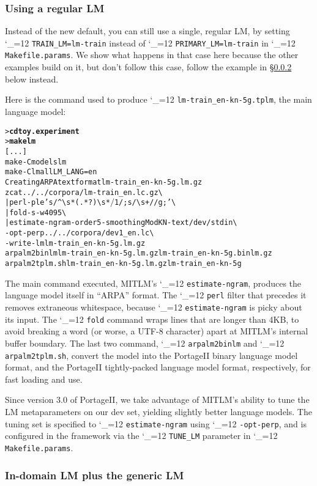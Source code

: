 \documentclass[11pt,letterpaper]{article}
\newcommand{\bs}{\textbackslash{}}
\newcommand{\PS}{PortageII\xspace}
\def\code{\begingroup\catcode`\_=12 \codex}
\newcommand{\codex}[1]{\texttt{#1}\endgroup}
\begin{document}
\subsubsection{Using a regular LM}

Instead of the new default, you can still use a single, regular LM, by setting
\code{TRAIN_LM=lm-train} instead of \code{PRIMARY_LM=lm-train} in
\code{Makefile.params}. We show what happens in that case here because the
other examples build on it, but don't follow this case, follow the example in
\S\ref{LM+generic-default} below instead.

Here is the command used to produce
\code{lm-train_en-kn-5g.tplm},
the main language model:
\begin{small}
\begin{alltt}
   > \textbf{cd toy.experiment}
   > \textbf{make lm}
   [...]
   make -C models lm
   make -C lm all LM_LANG=en
   Creating ARPA text format lm-train_en-kn-5g.lm.gz
   zcat ../../corpora/lm-train_en.lc.gz \bs
      | perl -ple 's/^{\bs}s*(.*?){\bs}s*$/$1/; s/{\bs}s+/ /g;' \bs
      | fold -s -w 4095 \bs
      | estimate-ngram -order 5 -smoothing ModKN -text /dev/stdin \bs
        -opt-perp ../../corpora/dev1_en.lc \bs
        -write-lm lm-train_en-kn-5g.lm.gz
   arpalm2binlm lm-train_en-kn-5g.lm.gz lm-train_en-kn-5g.binlm.gz
   arpalm2tplm.sh lm-train_en-kn-5g.lm.gz lm-train_en-kn-5g
\end{alltt}
\end{small}
The main command executed, MITLM's \code{estimate-ngram}, produces the language
model itself in ``ARPA'' format.  The \code{perl} filter that precedes it
removes extraneous whitespace, because \code{estimate-ngram} is picky about its
input.  The \code{fold} command wraps lines that are longer than 4KB, to avoid
breaking a word (or worse, a UTF-8 character) apart at MITLM's internal buffer
boundary.  The last two command, \code{arpalm2binlm} and \code{arpalm2tplm.sh},
convert the model into the \PS binary language model format, and the \PS
tightly-packed language model format, respectively, for fast loading and use.

Since version 3.0 of \PS, we take advantage of MITLM's ability to tune the LM
metaparameters on our dev set, yielding slightly better language models.  The
tuning set is specified to \code{estimate-ngram} using \code{-opt-perp}, and is
configured in the framework via the \code{TUNE_LM} parameter in
\code{Makefile.params}.

\subsubsection{In-domain LM plus the generic LM} \label{LM+generic-default}
\end{document}
